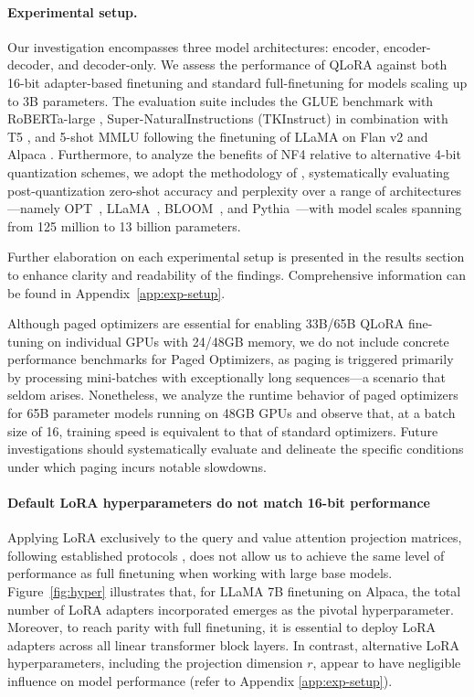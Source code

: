 \paragraph{Experimental setup.} Our investigation encompasses three model architectures: encoder, encoder-decoder, and decoder-only. We assess the performance of QLoRA against both 16-bit adapter-based finetuning and standard full-finetuning for models scaling up to 3B parameters. The evaluation suite includes the GLUE benchmark \citep{wang2018glue} with RoBERTa-large \citep{liu2019roberta}, Super-NaturalInstructions (TKInstruct) \citep{wang2022super} in combination with T5 \citep{t5}, and 5-shot MMLU \citep{hendrycksmeasuring} following the finetuning of LLaMA on Flan v2 \citep{longpre2023flan} and Alpaca \citep{alpaca}. Furthermore, to analyze the benefits of NF4 relative to alternative 4-bit quantization schemes, we adopt the methodology of \citet{dettmers2022case}, systematically evaluating post-quantization zero-shot accuracy and perplexity over a range of architectures—namely OPT~\citep{zhang2022opt}, LLaMA~\citep{touvron2023llama}, BLOOM~\citep{scao2022bloom}, and Pythia~\citep{biderman2023pythia}—with model scales spanning from 125 million to 13 billion parameters.

Further elaboration on each experimental setup is presented in the results section to enhance clarity and readability of the findings. Comprehensive information can be found in Appendix~\ref{app:exp-setup}.

Although paged optimizers are essential for enabling 33B/65B \textsc{QLoRA} fine-tuning on individual GPUs with 24/48GB memory, we do not include concrete performance benchmarks for Paged Optimizers, as paging is triggered primarily by processing mini-batches with exceptionally long sequences—a scenario that seldom arises. Nonetheless, we analyze the runtime behavior of paged optimizers for 65B parameter models running on 48GB GPUs and observe that, at a batch size of 16, training speed is equivalent to that of standard optimizers. Future investigations should systematically evaluate and delineate the specific conditions under which paging incurs notable slowdowns.

\paragraph{Default LoRA hyperparameters do not match 16-bit performance} 

Applying LoRA exclusively to the query and value attention projection matrices, following established protocols \citep{hu2021lora}, does not allow us to achieve the same level of performance as full finetuning when working with large base models. Figure~\ref{fig:hyper} illustrates that, for LLaMA 7B finetuning on Alpaca, the total number of LoRA adapters incorporated emerges as the pivotal hyperparameter. Moreover, to reach parity with full finetuning, it is essential to deploy LoRA adapters across all linear transformer block layers. In contrast, alternative LoRA hyperparameters, including the projection dimension $r$, appear to have negligible influence on model performance (refer to Appendix \ref{app:exp-setup}).

